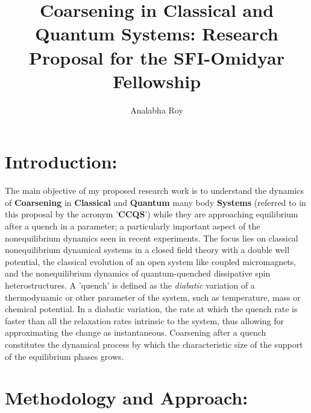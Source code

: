 \documentclass[a4paper,9pt]{article}
\title{Coarsening in Classical and Quantum Systems: Research Proposal for the SFI-Omidyar Fellowship}
\author{Analabha Roy}
\begin{document}
\maketitle
 
\section{Introduction:}
\label{sec:sciTecQuality}

The main objective of my proposed research work is to understand the dynamics of \textbf{Coarsening} in \textbf{Classical} and \textbf{Quantum} many body \textbf{Systems}
(referred to in this proposal by the acronym '\textbf{CCQS}') while they are approaching equilibrium after a quench in a  {parameter}; a particularly important aspect of the nonequilibrium dynamics seen in recent experiments. The focus lies on classical nonequilibrium dynamical systems in a closed field theory with a double well potential, the classical evolution of an open system like coupled micromagnets, and the nonequilibrium dynamics of quantum-quenched dissipative spin heterostructures. A 'quench' is defined as the \textit{diabatic} variation of a thermodynamic or other  {parameter} of the system, such as temperature, mass or chemical potential. In a diabatic variation, the rate at which the quench rate is faster than all the relaxation rates intrinsic to the system, thus allowing for approximating the change as instantaneous. 
Coarsening after a quench constitutes the dynamical process by which the characteristic  {size} of the support of the equilibrium phases grows.

\section{Methodology and Approach:}
\end{document}
